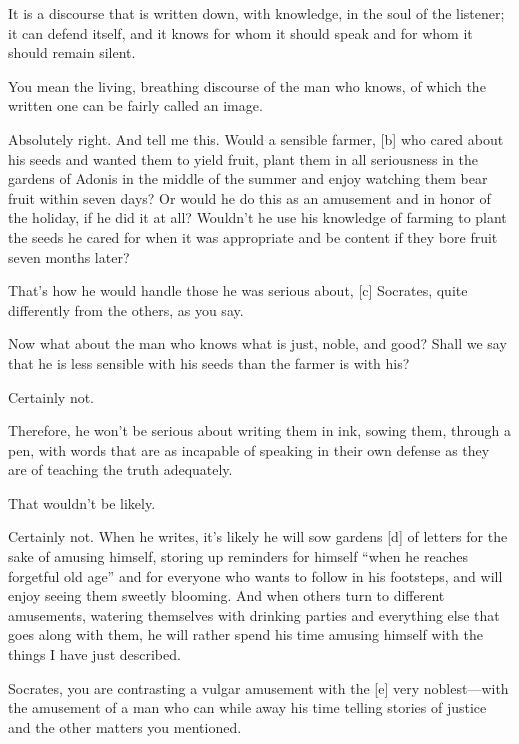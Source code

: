 \saysocrates It is a discourse that is written down, with knowledge, in the
soul of the listener; it can defend itself, and it knows for whom it
should speak and for whom it should remain silent.

\sayphaedrus You mean the living, breathing discourse of the man who knows,
of which the written one can be fairly called an image.

\saysocrates Absolutely right. And tell me this. Would a sensible farmer,
{[}b{]} who cared about his seeds and wanted them to yield fruit, plant
them in all seriousness in the gardens of Adonis in the middle of the
summer and enjoy watching them bear fruit within seven days? Or would he
do this as an amusement and in honor of the holiday, if he did it at
all? Wouldn't he use
his knowledge of farming to plant the seeds he cared for when it was
appropriate and be content if they bore fruit seven months later?

\sayphaedrus That's how he would handle those he was serious about, {[}c{]}
Socrates, quite differently from the others, as you say.

\saysocrates Now what about the man who knows what is just, noble, and
good? Shall we say that he is less sensible with his seeds than the
farmer is with his?

\sayphaedrus Certainly not.

\saysocrates Therefore, he won't be serious about writing them in ink,
sowing them, through a pen, with words that are as incapable of speaking
in their own defense as they are of teaching the truth adequately.

\sayphaedrus That wouldn't be likely.

\saysocrates Certainly not. When he writes, it's likely he will sow gardens
{[}d{]} of letters for the sake of amusing himself, storing up reminders
for himself “when he reaches forgetful old age” and for everyone who
wants to follow in his footsteps, and will enjoy seeing them sweetly
blooming. And when others turn to different amusements, watering
themselves with drinking parties and everything else that goes along
with them, he will rather spend his time amusing himself with the things
I have just described.

\sayphaedrus Socrates, you are contrasting a vulgar amusement with the
{[}e{]} very noblest---with the amusement of a man who can while away
his time telling stories of justice and the other matters you mentioned.

